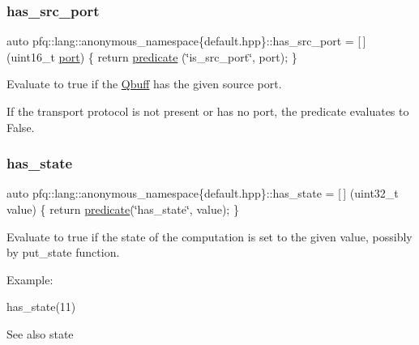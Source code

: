 \subsubsection{\texorpdfstring{has\+\_\+src\+\_\+port}{has\_src\_port}}
{\footnotesize\ttfamily auto pfq\+::lang\+::anonymous\+\_\+namespace\{default.\+hpp\}\+::has\+\_\+src\+\_\+port = \mbox{[}$\,$\mbox{]} (uint16\+\_\+t \hyperlink{namespacepfq_1_1lang_1_1anonymous__namespace_02default_8hpp_03_a868eca03290a037cb4e9b7075085888b}{port}) \{ return \hyperlink{namespacepfq_1_1lang_aca9adafc436b7f851621b979fa1aaf88}{predicate} (\char`\"{}is\+\_\+src\+\_\+port\char`\"{}, port); \}}



Evaluate to {\ttfamily true} if the \hyperlink{structpfq_1_1lang_1_1Qbuff}{Qbuff} has the given source port. 

If the transport protocol is not present or has no port, the predicate evaluates to False. \mbox{\label{namespacepfq_1_1lang_1_1anonymous__namespace_02default_8hpp_03_a8efacc41a17e01f17a25e8fc1d784c74}} 
\subsubsection{\texorpdfstring{has\+\_\+state}{has\_state}}
{\footnotesize\ttfamily auto pfq\+::lang\+::anonymous\+\_\+namespace\{default.\+hpp\}\+::has\+\_\+state = \mbox{[}$\,$\mbox{]} (uint32\+\_\+t value) \{ return \hyperlink{namespacepfq_1_1lang_aca9adafc436b7f851621b979fa1aaf88}{predicate}(\char`\"{}has\+\_\+state\char`\"{}, value); \}}



Evaluate to {\ttfamily true} if the state of the computation is set to the given {\ttfamily value}, possibly by put\+\_\+state function. 

Example\+:

has\+\_\+state(11)

\begin{DoxySeeAlso}{See also}
state 
\end{DoxySeeAlso}
\mbox{\label{namespacepfq_1_1lang_1_1anonymous__namespace_02default_8hpp_03_a99c204d8095fdccd50d4cb24d32e5b5b}} 
